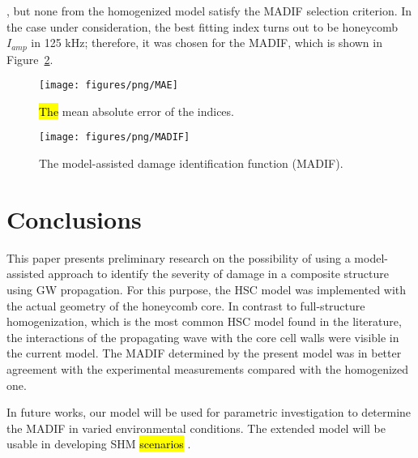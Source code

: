 \documentclass[sensors,article,accept,moreauthors,pdftex]{Definitions/mdpi}
\begin{document}
\begin{paracol}{2}
, but none from the homogenized model satisfy the MADIF selection criterion.
In the case under consideration, the best fitting index turns out to be honeycomb \(I_{amp}\) in 125 kHz; therefore, it was chosen for the MADIF, which is shown in Figure~\ref{fig:MADIF}. 

\vspace{-6pt}
\begin{figure}[H]
		\texttt{[image: figures/png/MAE]}
	\caption{\hl{The} %
 mean absolute error of the indices.}
	\label{fig:MAE}
\end{figure}
\vspace{-12pt}
\begin{figure}[H]
		\texttt{[image: figures/png/MADIF]}
	\caption{The model-assisted damage identification function (MADIF).}
	\label{fig:MADIF}
\end{figure}


\section{Conclusions}
\label{sec:conc}
This paper presents preliminary research on the possibility of using a model-assisted approach to identify the severity of damage in a composite structure using GW propagation.
For this purpose, the HSC model was implemented with the actual geometry of the honeycomb core.
In contrast to  full-structure homogenization, which is the most common HSC model found in the literature, the interactions of the propagating wave with the core cell walls were visible in the current model.
The MADIF determined by  the present model was in better agreement with the experimental measurements compared with the homogenized one.

In  future works, our model will be used for parametric investigation to determine the MADIF in varied environmental conditions. 
The extended model will be usable in developing SHM \hl{scenarios}%
.


\end{paracol}
\end{document}
